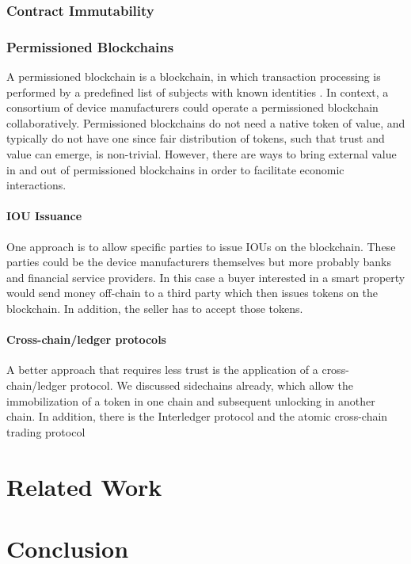 \subsubsection{Contract Immutability}

\subsubsection{Permissioned Blockchains}

A permissioned blockchain is a blockchain, in which transaction processing is performed
by a predefined list of subjects with known identities \cite{BitFuryPermissioned2015}. In context, a consortium of device manufacturers could operate a permissioned blockchain collaboratively. Permissioned blockchains do not need a native token of value, and typically do not have one since fair distribution of tokens, such that trust and value can emerge, is non-trivial. However, there are ways to bring external value in and out of permissioned blockchains in order to facilitate economic interactions. 
\paragraph{IOU Issuance}
One approach is to allow specific parties to issue IOUs on the blockchain. These parties could be the device manufacturers themselves but more probably banks and financial service providers. In this case a buyer interested in a smart property would send money off-chain to a third party which then issues tokens on the blockchain. In addition, the seller has to accept those tokens. 

\paragraph{Cross-chain/ledger protocols}
A better approach that requires less trust is the application of a cross-chain/ledger protocol. We discussed sidechains already, which allow the immobilization of a token in one chain and subsequent unlocking in another chain. In addition, there is the Interledger protocol \cite{hope2016interledger} and the atomic cross-chain trading protocol \cite{atomiccrosschaintrading}



\section{Related Work}


\section{Conclusion}

